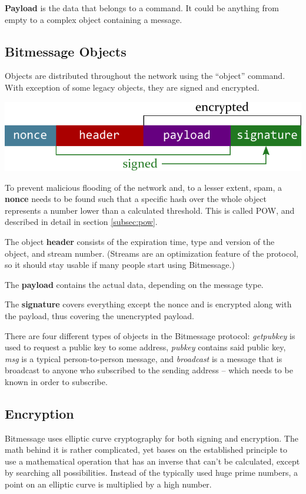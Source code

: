\documentclass{bfh}
\begin{document}
  \textbf{Payload} is the data that belongs to a command. It could be anything from empty to a complex object containing a message.


  \subsection{Bitmessage Objects}
  Objects are distributed throughout the network using the ``object'' command. With exception of some legacy objects, they are signed and encrypted.

  \includegraphics[width=\textwidth]{images/object.pdf}

  To prevent malicious flooding of the network and, to a lesser extent, spam, a \textbf{nonce} needs to be found such that a specific hash over the whole object represents a number lower than a calculated threshold. This is called \acf{POW}, and described in detail in section \ref{subsec:pow}.

  The object \textbf{header} consists of the expiration time, type and version of the object, and stream number. (Streams are an optimization feature of the protocol, so it should stay usable if many people start using Bitmessage.)
  
  The \textbf{payload} contains the actual data, depending on the message type.
  
  The \textbf{signature} covers everything except the nonce and is encrypted along with the payload, thus covering the unencrypted payload.

  There are four different types of objects in the Bitmessage protocol: \textit{getpubkey} is used to request a public key to some address, \textit{pubkey} contains said public key, \textit{msg} is a typical person-to-person message, and \textit{broadcast} is a message that is broadcast to anyone who subscribed to the sending address -- which needs to be known in order to subscribe.


  \subsection{Encryption}
  \label{subsec:encryption}
  Bitmessage uses elliptic curve cryptography for both signing and encryption. The math behind it is rather complicated, yet bases on the established principle to use a mathematical operation that has an inverse that can't be calculated, except by searching all possibilities. Instead of the typically used huge prime numbers, a point on an elliptic curve is multiplied by a high number.
\end{document}
